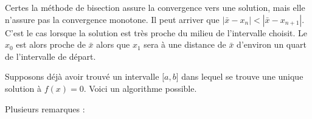 \begin{normaltext}
	Certes la méthode de bisection assure la convergence vers une solution, mais elle n'assure pas la convergence monotone. Il peut arriver que \( | \bar x-x_n |<| \bar x-x_{n+1} |\). C'est le cas lorsque la solution est très proche du milieu de l'intervalle choisit. Le \( x_0\) est alors proche de \( \bar x\) alors que \( x_1\) sera à une distance de \( \bar x\) d'environ un quart de l'intervalle de départ.
\end{normaltext}

Supposons déjà avoir trouvé un intervalle \( \mathopen[ a , b \mathclose]\) dans lequel se trouve une unique solution à \( f(x)=0\). Voici un algorithme possible.



Plusieurs remarques :

